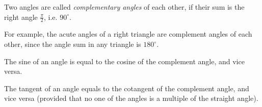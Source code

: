 \documentclass[12pt]{article}
\theoremstyle{definition}
\begin{document}
Two angles are called {\em complementary angles} of each other, if their sum is the right angle $\displaystyle\frac{\pi}{2}$, i.e. $90^\circ$.  

For example, the acute angles of a right triangle are complement angles of each other, since the angle sum in any triangle is $180^\circ$.

The sine of an angle is equal to the cosine of the complement angle, and vice versa. 

The tangent of an angle equals to the cotangent of the complement angle, and vice versa (provided that no one of the angles is a multiple of the straight angle).
\end{document}
